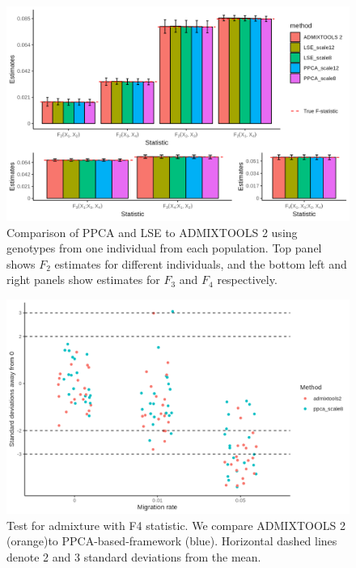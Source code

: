 \documentclass[12pt, letterpaper]{article}
\begin{document}
\begin{figure}[ht!]
    \includegraphics[width=16.5cm]{Images/Supplement/mu0.05_plot_all_1ind.png}
    \centering
    \caption{Comparison of PPCA and LSE to ADMIXTOOLS 2 using genotypes from one individual from each population. Top panel shows $F_2$ estimates for different individuals, and the bottom left and right panels show estimates for $F_3$ and $F_4$ respectively.}
    \label{figS2:pc_scale}
\end{figure}

\begin{figure}[ht!]
    \includegraphics[width=16.5cm]{Images/Supplement/hypothesis_test_comparison.png}
    \centering
    \caption{Test for admixture with F4 statistic. We compare ADMIXTOOLS 2 (orange)to PPCA-based-framework (blue). Horizontal dashed lines denote 2 and 3 standard deviations from the mean.} 
    \label{figS2:pc_scale}
\end{figure}
\end{document}
